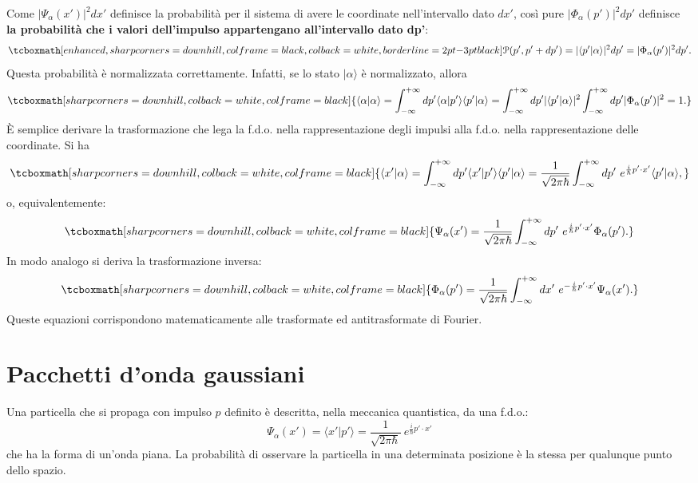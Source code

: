 \documentclass[a4paper,12pt,oneside]{book}
\begin{document}
Come $|\Psi_\alpha (x')|^2 dx'$ definisce la probabilità per il sistema di avere le coordinate nell'intervallo dato $dx'$, così pure $|\Phi_\alpha (p')|^2 dp'$ definisce \textbf{la probabilità che i valori dell'impulso appartengano all'intervallo dato dp'}:
	\begin{equation}
		\tcboxmath[enhanced, sharp corners=downhill, colframe=black, colback=white, borderline={2pt}{-3pt}{black}]{
			\mathcal{P}(p', p'+dp') = |\langle p' | \alpha \rangle|^2 dp' = |\Phi_\alpha (p')|^2 dp'.
			}
	\end{equation}
Questa probabilità è normalizzata correttamente. Infatti, se lo stato $| \alpha \rangle$ è normalizzato, allora
	\begin{equation}
		\tcboxmath[sharp corners=downhill, colback=white, colframe=black]{
			\langle \alpha | \alpha \rangle = \int_{-\infty}^{+\infty} dp' \langle \alpha | p' \rangle \langle p' | \alpha \rangle = \int_{-\infty}^{+\infty} dp' | \langle p' | \alpha \rangle |^2 \int_{-\infty}^{+\infty} dp' |\Phi_\alpha (p')|^2 = 1 .
			}
	\end{equation}
\`E semplice derivare la trasformazione che lega la f.d.o. nella rappresentazione degli impulsi alla f.d.o. nella rappresentazione delle coordinate. Si ha
	\begin{equation}
		\tcboxmath[sharp corners=downhill, colback=white, colframe=black]{
			\langle x' | \alpha \rangle = \int_{-\infty}^{+\infty} dp' \langle x' | p' \rangle \langle p' | \alpha \rangle =  \frac{1}{\sqrt{2 \pi \hbar}} \int_{-\infty}^{+\infty} dp' ~ e^{\frac{i}{\hbar}p' \cdot x'} \langle p' | \alpha \rangle ,
			}
	\end{equation}
o, equivalentemente:
	\begin{equation}
		\tcboxmath[sharp corners=downhill, colback=white, colframe=black]{
			\Psi_\alpha (x') = \frac{1}{\sqrt{2 \pi \hbar}} \int_{-\infty}^{+\infty} dp' ~ e^{\frac{i}{\hbar}p' \cdot x'} \Phi_\alpha (p').
			}
	\end{equation}
In modo analogo si deriva la trasformazione inversa:
	\begin{equation}
		\tcboxmath[sharp corners=downhill, colback=white, colframe=black]{
			\Phi_\alpha (p') = \frac{1}{\sqrt{2 \pi \hbar}} \int_{-\infty}^{+\infty} dx' ~ e^{-\frac{i}{\hbar}p' \cdot x'} \Psi_\alpha (x').
			}
	\end{equation}
Queste equazioni corrispondono matematicamente alle trasformate ed antitrasformate di Fourier.
\section[Pacchetti d'onda gaussiani]{Pacchetti d'onda gaussiani }
Una particella che si propaga con impulso $p$ definito è descritta, nella meccanica quantistica, da una f.d.o.:
	\begin{equation}
		\Psi_\alpha (x') = \langle x' | p' \rangle = \frac{1}{\sqrt{2 \pi \hbar}}~  e^{\frac{i}{\hbar}p' \cdot x'}
	\end{equation}
che ha la forma di un'onda piana. La probabilità di osservare la particella in una determinata posizione è la stessa per qualunque punto dello spazio.\\
\end{document}
